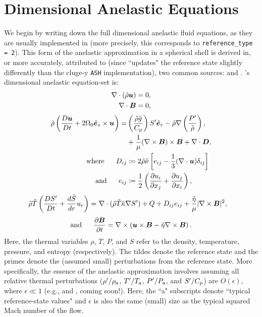 \documentclass[12pt]{article}
\numberwithin{equation}{section}
\newcommand{\tmpa}{T_{\rm a}}
\newcommand{\rhoa}{\rho_{\rm a}}
\newcommand{\prsa}{P_{\rm a}}
\begin{document}
	\section{Dimensional Anelastic Equations}
	We begin by writing down the full dimensional anelastic fluid equations, as they are usually implemented in {\rayleigh} (more precisely, this corresponds to \texttt{reference\_type = 2}). This form of the anelastic approximation in a spherical shell is derived in, or more accurately, attributed to (since {\rayleigh} ``updates" the reference state slightly differently than the cluge-y \texttt{ASH} implementation), two common sources: \citet{Gilman1981} and \citet{Clune1999}. {\rayleigh}'s dimensional anelastic equation-set is:
	\begin{align}
		\nabla\cdot(\tilde{\rho}\bm{u}) &= 0\label{eq:contdim},\\
		\nabla\cdot \bm{B} &= 0,
	\end{align}
	\begin{subequations}\label{eq:momdim}
	\begin{align}
		\tilde{\rho}\left(\frac{D\bm{u}}{Dt}+2\Omega_0\hat{\bm{e}}_z\times\bm{u}\right) = &  \left(\frac{\tilde{\rho} \tilde{g}}{C_{\rm{p}}}\right) {S^\prime}\hat{\bm{e}}_r-\tilde{\rho}\nabla\left( \frac{{P^\prime}}{\tilde{\rho}} \right), \nonumber\\
		&+ \frac{1}{\mu}(\nabla\times\bm{B})\times\bm{B}+\nabla\cdot\bm{D},\\
		\text{where}\ \ \ \ \  D_{ij} &\coloneqq 2\tilde{\rho}\tilde{\nu} \left[e_{ij} - \frac{1}{3}(\nabla\cdot\bm{u}) \delta_{ij} \right]\label{eq:dstressdim}\\
		\text{and}\ \ \ \ \  e_{ij} &\coloneqq \frac{1}{2}\left(\frac{\partial u_i}{\partial x_j} + \frac{\partial u_j}{\partial x_i} \right),\label{eq:estressdim}
	\end{align}
	\end{subequations}
	\begin{align}\label{eq:endim}
		\tilde{\rho}\tilde{T} \left(\frac{D{S^\prime}}{Dt} + \frac{d\tilde{S}}{dr} u_r\right) = &\ \nabla\cdot(\tilde{\rho} \tilde{T} \tilde{\kappa} \nabla {S^\prime}) +Q+ D_{ij}e_{ij} + \frac{\tilde{\eta}}{\mu}|\nabla\times\bm{B}|^2,
	\end{align}
	\begin{align}\label{eq:inddim}
	\text{and}\ \ \ \ \  \frac{\partial\bm{B}}{\partial t} = \nabla\times\left(\bm{u}\times\bm{B} - \tilde{\eta}\nabla\times\bm{B}\right).
	\end{align}
	Here, the thermal variables $\rho$, $T$, $P$, and $S$ refer to the density, temperature, pressure, and entropy (respectively). The tildes denote the reference state and the primes denote the (assumed small) perturbations from the reference state. More specifically, the essence of the anelastic approximation involves assuming all relative thermal perturbations ($\rhoprime/\rhoa$, $\tmpprime/\tmpa$, $\prsprime/\prsa$, and ${S^\prime}/C_{\rm{p}}$) are $O(\epsilon)$, where $\epsilon\ll1$ (e.g., \citealt{Ogura1962,Gough1969} and \citealt{Matilsky2024b}, coming soon!). Here, the ``a" subscripts denote ``typical reference-state values" and $\epsilon$ is also the same (small) size as the typical squared Mach number of the flow. 
	
\end{document}
